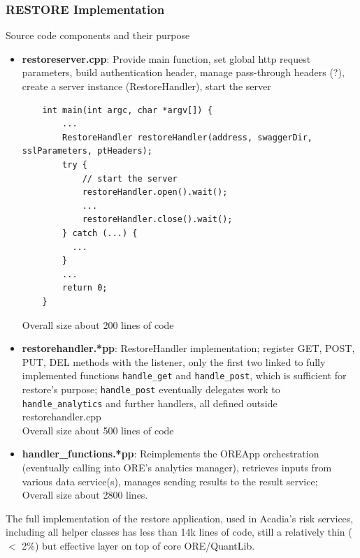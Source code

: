 \documentclass[12pt, a4paper]{report}
\begin{document}
\subsubsection*{RESTORE Implementation}

Source code components and their purpose
\begin{itemize}
\item {\bf restoreserver.cpp}: Provide main function, set global http request parameters, build
  authentication header, manage pass-through headers (?), create a server instance (RestoreHandler),
  start the server
  \begin{verbatim}
    int main(int argc, char *argv[]) {
        ...
        RestoreHandler restoreHandler(address, swaggerDir, sslParameters, ptHeaders);
        try {
            // start the server
            restoreHandler.open().wait();
            ...
            restoreHandler.close().wait();
        } catch (...) {
          ...
        }
        ...
        return 0;
    }    
  \end{verbatim}
  Overall size about 200 lines of code
\item {\bf restorehandler.*pp}: RestoreHandler implementation; register GET, POST, PUT, DEL methods with
  the listener, only the first two linked to fully implemented functions {\tt handle\_get} and
  {\tt handle\_post}, which is sufficient for restore's purpose;
  {\tt handle\_post} eventually delegates work to {\tt handle\_analytics} and further handlers,
  all defined outside restorehandler.cpp\\
  Overall size about 500 lines of code
\item {\bf handler\_functions.*pp}: Reimplements the OREApp orchestration (eventually calling into ORE's
  analytics manager), retrieves inputs from various data service(s), manages sending results to the result
  service;\\
  Overall size about 2800 lines.
\end{itemize}
The full implementation of the restore application, used in Acadia's risk services, including all
helper classes has less than 14k lines of code, still a relatively thin ($<$ 2\%) but effective layer
on top of core ORE/QuantLib.
\end{document}
